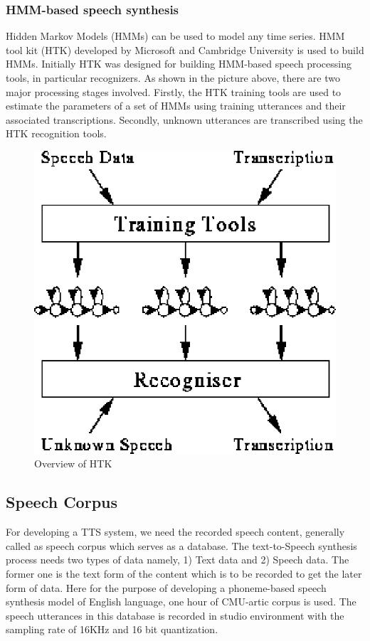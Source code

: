 \documentclass{article}
\begin{document}
\subsubsection{HMM-based speech synthesis}
\label{ssec:hmm}
Hidden Markov Models (HMMs) can be used to model any time series. HMM tool kit (HTK) developed by Microsoft and Cambridge University is used to build HMMs. Initially HTK was
designed for building HMM-based speech processing tools, in particular recognizers. As 
shown in the picture above, there are two major processing stages involved. Firstly, the HTK training tools are used to estimate the parameters of a set of HMMs using training
utterances and their associated transcriptions. Secondly, unknown utterances are
transcribed using the HTK recognition tools.

\begin{figure}[h]
\centering
\includegraphics[scale=0.45]{figures/htk_overview.eps}
\caption{Overview of HTK}
\label{fig:htkOverview}
\end{figure}

\subsection{Speech Corpus}
For developing a TTS system, we need the recorded speech content, generally called
as speech corpus which serves as a database. The text-to-Speech synthesis process needs
two types of data namely, 1) Text data and 2) Speech data. The former one is the text
form of the content which is to be recorded to get the later form of data. Here for the 
purpose of developing a phoneme-based speech synthesis model of English language, one
hour of CMU-artic corpus is used. The speech utterances in this database is recorded in 
studio environment with the sampling rate of 16KHz and 16 bit quantization.
\end{document}
